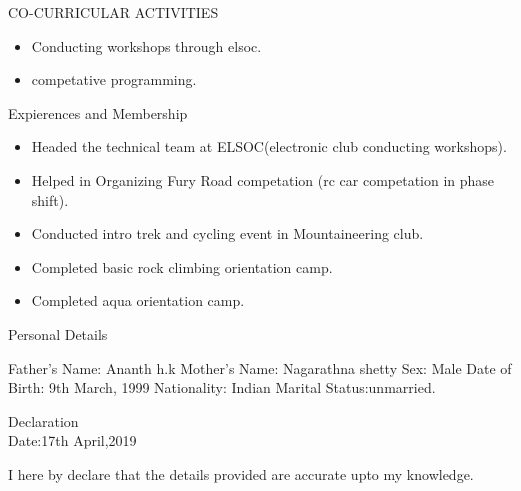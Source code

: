 \documentclass[10pt]{article}
\begin{document}
		
	\begin{minipage}[t][3cm][t]{0.2\textwidth}
		CO-CURRICULAR ACTIVITIES
		
	\end{minipage}
	\begin{minipage}[t][3cm][t]{0.8\textwidth}
		\begin{itemize}
		\item Conducting workshops through elsoc.
		\item competative programming.
	
	\end{itemize}
		
	\end{minipage}



		\begin{minipage}[t][4cm][t]{0.2\textwidth}
		Expierences and Membership
		
	\end{minipage}
	\begin{minipage}[t][4cm][t]{0.8\textwidth}
		\begin{itemize}
			\item Headed the technical team at ELSOC(electronic club conducting workshops).
			\item Helped in Organizing Fury Road competation (rc car competation in phase shift).
			\item Conducted intro trek and cycling event in Mountaineering club.
			\item Completed basic rock climbing orientation  camp.
			\item Completed aqua orientation camp.
			
		\end{itemize}
		
	\end{minipage}


		
	\begin{minipage}[t][3cm][t]{0.2\textwidth}
		Personal Details
		
	\end{minipage}
	\begin{minipage}[t][3cm][t]{0.8\textwidth}
		Father's Name: Ananth h.k
		\newline Mother's Name: Nagarathna shetty
		\newline Sex: Male
		\newline Date of Birth: 9th March, 1999
		\newline Nationality: Indian
		\newline Marital Status:unmarried.
		
	\end{minipage}

	
		\begin{minipage}[t][2cm][t]{0.2\textwidth}
		Declaration
		\\
		Date:17th April,2019 
		
	\end{minipage}
	\begin{minipage}[t][2cm][t]{0.8\textwidth}
			I here by declare that the details provided are accurate upto my knowledge.
		
	\end{minipage}


	

	
	
\end{document}
